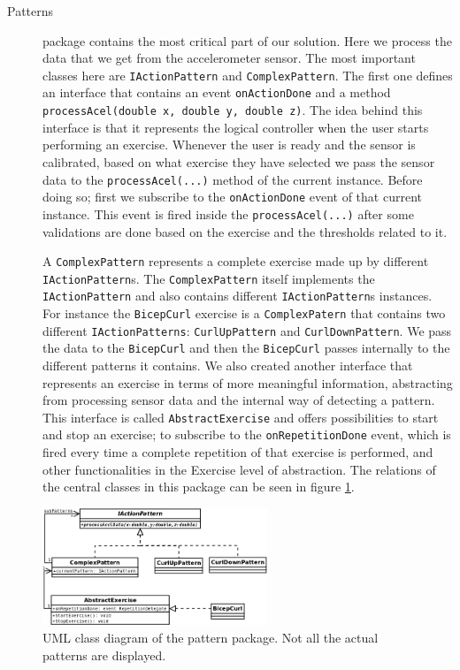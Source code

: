 \documentclass{tk3-team}
\begin{document}
\begin{description}
\item[Patterns] package contains the most critical part of our solution. Here we process the data that we get from the accelerometer sensor. The most important classes here are \texttt{IActionPattern} and \texttt{ComplexPattern}. The first one defines an interface that contains an event \texttt{onActionDone} and a method \texttt{processAcel(double x, double y, double z)}. The idea behind this interface is that it represents the logical controller when the user starts performing an exercise. Whenever the user is ready and the sensor is calibrated, based on what exercise they have selected we pass the sensor data to the \texttt{processAcel(...)} method of the current instance. Before doing so; first we subscribe to the \texttt{onActionDone} event of that current instance. This event is fired inside the \texttt{processAcel(...)} after some validations are done based on the exercise and the thresholds related to it.

A \texttt{ComplexPattern} represents a complete exercise made up by different \texttt{IActionPattern}s. The \texttt{ComplexPattern} itself implements the \texttt{IActionPattern} and also contains different \texttt{IActionPattern}s instances. For instance the \texttt{BicepCurl} exercise is a \texttt{ComplexPatern} that contains two different \texttt{IActionPatterns}: \texttt{CurlUpPattern} and \texttt{CurlDownPattern}. We pass the data to the \texttt{BicepCurl} and then the \texttt{BicepCurl} passes internally to the different patterns it contains. We also created another interface that represents an exercise in terms of more meaningful information, abstracting from processing sensor data and the internal way of detecting a pattern. This interface is called \texttt{AbstractExercise} and offers possibilities to start and stop an exercise; to subscribe to the \texttt{onRepetitionDone} event, which is fired every time a complete repetition of that exercise is performed, and other functionalities in the Exercise level of abstraction. The relations of the central classes in this package can be seen in figure \ref{fig_pattern_model}.
\end{description}

\begin{figure}[!t]
\centering
\includegraphics[width=0.6\textwidth]{img/Ilift_pattern_uml}
\caption{UML class diagram of the pattern package. Not all the actual patterns are displayed.}
\label{fig_pattern_model}
\end{figure}
\end{document}
